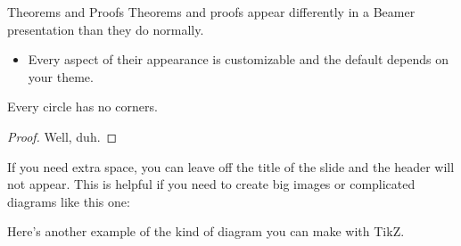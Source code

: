 \documentclass{beamer}
\begin{document}

\begin{frame}{Theorems and Proofs}
    Theorems and proofs appear differently in a Beamer presentation than they do normally.
    \begin{itemize}
        \item Every aspect of their appearance is customizable and the default depends on your theme.
    \end{itemize}
    
    \begin{theorem}
        Every circle has no corners.
    \end{theorem}

    \begin{proof}
        Well, duh.
    \end{proof}
\end{frame}


\begin{frame}
    If you need extra space, you can leave off the title of the slide and the header will not appear.
    This is helpful if you need to create big images or complicated diagrams like this one:

    \begin{center}
        
    \end{center}

\end{frame}


\begin{frame}
Here's another example of the kind of diagram you can make with TikZ.

\begin{center}
    
\end{center}

\end{frame}
\end{document}
